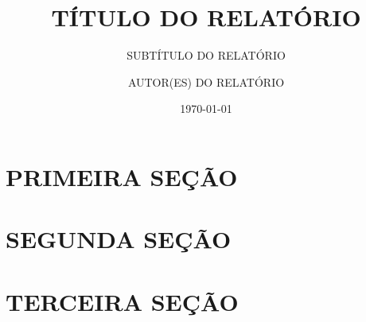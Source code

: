 \documentclass[a4paper]{article}
\author{AUTOR(ES) DO RELATÓRIO}
\date{\today}
\title{TÍTULO DO RELATÓRIO}
\subtitle{SUBTÍTULO DO RELATÓRIO}
\begin{document}
\maketitle

\tableofcontents

\newpage

\section{PRIMEIRA SEÇÃO}

\lipsum

\section{SEGUNDA SEÇÃO}

\lipsum

\section{TERCEIRA SEÇÃO}

\lipsum

\newpage


\end{document}
